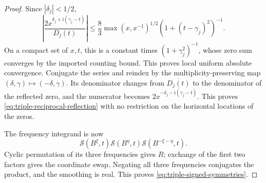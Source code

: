 \documentclass[11pt]{article}
\newcommand{\ii}{\mathrm i}
\newcommand{\ZS}{\mathcal S}
\begin{document}
\begin{proof}
Since \(|\delta_j|<1/2\),
\[
 \left|\frac{2x^{\delta_j+\ii(\gamma_j-t)}}{D_j(t)}\right|
 \leq\frac{8}{3}\max(x,x^{-1})^{1/2}
                  (1+(t-\gamma_j)^2)^{-1}.
\]
On a compact set of \(x,t\), this is a constant times
\((1+\gamma_j^2)^{-1}\), whose zero sum converges by the imported
counting bound. This proves local uniform absolute convergence.
Conjugate the series and reindex by the multiplicity-preserving map
\((\delta,\gamma)\mapsto(-\delta,\gamma)\). Its denominator changes
from \(\overline{D_j(t)}\) to the denominator of the reflected zero,
and the numerator becomes \(2x^{-\delta_j-\ii(\gamma_j-t)}\).
This proves \eqref{eq:triple-reciprocal-reflection} with no restriction
on the horizontal locations of the zeros.

The frequency integrand is now
\[
 \ZS(B^\xi,t)\ZS(B^\eta,t)\ZS(B^{-\xi-\eta},t).
\]
Cyclic permutation of its three frequencies gives \(R\); exchange
of the first two factors gives the coordinate swap. Negating all three
frequencies conjugates the product, and the smoothing is real. This
proves \eqref{eq:triple-signed-symmetries}.


\end{proof}
\end{document}
